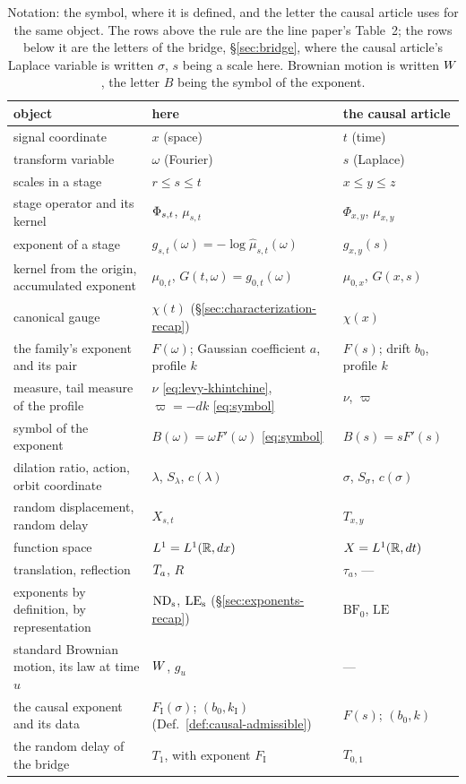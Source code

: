 \begin{table}[!htb]
\centering
\caption{Notation: the symbol, where it is defined, and the letter the causal article
uses for the same object. The rows above the rule are the line paper's Table~2; the rows
below it are the letters of the bridge, \S\ref{sec:bridge}, where the causal article's
Laplace variable is written $\sigma$, $s$ being a scale here. Brownian motion is written $W$, the letter $B$ being
the symbol of the exponent.}
\label{tab:notation}
\footnotesize
\setlength{\tabcolsep}{3pt}
\begin{tabular}{@{}lll@{}}
\toprule
object & here & the causal article \\
\midrule
signal coordinate & $x$ (space) & $t$ (time) \\
transform variable & $\omega$ (Fourier) & $s$ (Laplace) \\
scales in a stage & $r \le s \le t$ & $x \le y \le z$ \\
stage operator and its kernel & $\Phi_{s,t}$, $\mu_{s,t}$ & $\Phi_{x,y}$, $\mu_{x,y}$ \\
exponent of a stage & $g_{s,t}(\omega) = -\log\hat\mu_{s,t}(\omega)$ & $g_{x,y}(s)$ \\
kernel from the origin, accumulated exponent & $\mu_{0,t}$, $G(t,\omega) = g_{0,t}(\omega)$ & $\mu_{0,x}$, $G(x,s)$ \\
canonical gauge & $\chi(t)$ (\S\ref{sec:characterization-recap}) & $\chi(x)$ \\
the family's exponent and its pair & $F(\omega)$; Gaussian coefficient $a$, profile $k$ & $F(s)$; drift $b_0$, profile $k$ \\
\Levy{} measure, tail measure of the profile & $\nu$ \ref{eq:levy-khintchine}, $\varpi = -dk$ \ref{eq:symbol} & $\nu$, $\varpi$ \\
symbol of the exponent & $B(\omega) = \omega F'(\omega)$ \ref{eq:symbol} & $B(s) = sF'(s)$ \\
dilation ratio, action, orbit coordinate & $\lambda$, $S_\lambda$, $c(\lambda)$ & $\sigma$, $S_\sigma$, $c(\sigma)$ \\
random displacement, random delay & $X_{s,t}$ & $T_{x,y}$ \\
function space & $L^1 = L^1(\mathbb{R},dx)$ & $X = L^1(\mathbb{R},dt)$ \\
translation, reflection & $T_{a}$, $R$ & $\tau_a$, --- \\
exponents by definition, by representation & $\mathrm{ND}_{\mathrm{s}}$, $\mathrm{LE}_{\mathrm{s}}$ (\S\ref{sec:exponents-recap}) & $\mathrm{BF}_0$, $\mathrm{LE}$ \\
\midrule
standard Brownian motion, its law at time $u$ & $W$, $g_u$ & --- \\
the causal exponent and its data & $F_{\mathrm I}(\sigma)$; $(b_0, k_{\mathrm I})$ (Def.~\ref{def:causal-admissible}) & $F(s)$; $(b_0, k)$ \\
the random delay of the bridge & $T_1$, with exponent $F_{\mathrm I}$ & $T_{0,1}$ \\
\bottomrule
\end{tabular}
\end{table}

